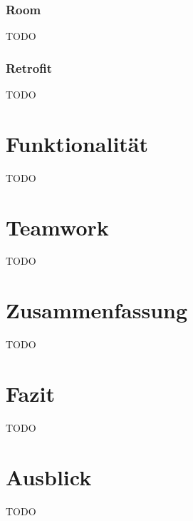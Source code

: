 \documentclass[a4paper]{article}
\begin{document}
\subsubsection{Room}
\label{subsubsec:technologies:bibs:room}
TODO


\subsubsection{Retrofit}
\label{subsubsec:technologies:bibs:retrofit}
TODO


\section{Funktionalität}
\label{sec:functionality}
TODO


\section{Teamwork}
\label{sec:teamwork}
TODO


\section{Zusammenfassung}
\label{sec:summary}
TODO


\section{Fazit}
\label{sec:conclusion}
TODO


\section{Ausblick}
\label{sec:outlook}
TODO


\printbibliography[title={Referenzen}]
\end{document}
